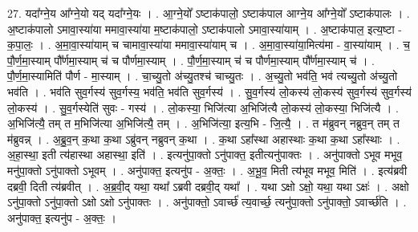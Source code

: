 \documentclass[17pt]{extarticle}
\begin{document}
27. यदा᳚ग्ने॒य आ᳚ग्ने॒यो यद् यदा᳚ग्ने॒यः । . आ॒ग्ने॒यो᳚ ऽष्टाक॑पालो॒ ऽष्टाक॑पाल आग्ने॒य आ᳚ग्ने॒यो᳚ ऽष्टाक॑पालः । . अ॒ष्टाक॑पालो ऽमावा॒स्या॑या ममावा॒स्या॑या म॒ष्टाक॑पालो॒ ऽष्टाक॑पालो ऽमावा॒स्या॑याम् । . अ॒ष्टाक॑पाल॒ इत्य॒ष्टा - क॒पा॒लः॒ । . अ॒मा॒वा॒स्या॑याम् च चामावा॒स्या॑या ममावा॒स्या॑याम् च । . अ॒मा॒वा॒स्या॑या॒मित्य॑मा - वा॒स्या॑याम् । . च॒ पौ॒र्ण॒मा॒स्याम् पौ᳚र्णमा॒स्याम् च॑ च पौर्णमा॒स्याम् । . पौ॒र्ण॒मा॒स्याम् च॑ च पौर्णमा॒स्याम् पौ᳚र्णमा॒स्याम् च॑ । . पौ॒र्ण॒मा॒स्यामिति॑ पौर्ण - मा॒स्याम् । . चा॒च्यु॒तो अ॑च्यु॒तश्च॑ चाच्यु॒तः । . अ॒च्यु॒तो भव॑ति॒ भव॑ त्यच्यु॒तो अ॑च्यु॒तो भव॑ति । . भव॑ति सुव॒र्गस्य॑ सुव॒र्गस्य॒ भव॑ति॒ भव॑ति सुव॒र्गस्य॑ । . सु॒व॒र्गस्य॑ लो॒कस्य॑ लो॒कस्य॑ सुव॒र्गस्य॑ सुव॒र्गस्य॑ लो॒कस्य॑ । . सु॒व॒र्गस्येति॑ सुवः - गस्य॑ । . लो॒कस्या॒ भिजि॑त्या अ॒भिजि॑त्यै लो॒कस्य॑ लो॒कस्या॒ भिजि॑त्यै । . अ॒भिजि॑त्यै॒ तम् त म॒भिजि॑त्या अ॒भिजि॑त्यै॒ तम् । . अ॒भिजि॑त्या॒ इत्य॒भि - जि॒त्यै॒ । . त म॑ब्रुवन् नब्रुव॒न् तम् त म॑ब्रुवन्न् । . अ॒ब्रु॒व॒न् क॒था क॒था ऽब्रु॑वन् नब्रुवन् क॒था । . क॒था ऽहा᳚स्था अहास्थाः क॒था क॒था ऽहा᳚स्थाः । . अ॒हा॒स्था॒ इती त्य॑हास्था अहास्था॒ इति॑ । . इत्यनु॑पा॒क्तो ऽनु॑पाक्त॒ इतीत्यनु॑पाक्तः । . अनु॑पाक्तो ऽभूव मभूव॒ मनु॑पा॒क्तो ऽनु॑पाक्तो ऽभूवम् । . अनु॑पाक्त॒ इत्यनु॑प - अ॒क्तः॒ । . अ॒भू॒व॒ मिती त्य॑भूव मभूव॒ मिति॑ । . इत्य॑ब्रवी दब्रवी॒ दिती त्य॑ब्रवीत् । . अ॒ब्र॒वी॒द् यथा॒ यथा᳚ ऽब्रवी दब्रवी॒द् यथा᳚ । . यथा ऽक्षो ऽक्षो॒ यथा॒ यथा ऽक्षः॑ । . अक्षो ऽनु॑पा॒क्तो ऽनु॑पा॒क्तो ऽक्षो ऽक्षो ऽनु॑पाक्तः । . अनु॑पाक्तो॒ ऽवार्च्छ॑ त्य॒वार्च्छ॒ त्यनु॑पा॒क्तो ऽनु॑पाक्तो॒ ऽवार्च्छ॑ति । . अनु॑पाक्त॒ इत्यनु॑प - अ॒क्तः॒ । \newline
\end{document}
